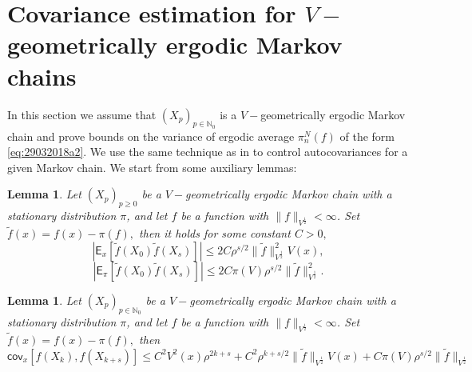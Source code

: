\documentclass[bj]{imsart}
\def\PCov{\mathsf{cov}}
\def\nset{\mathbb{N}}
\newtheorem{lem}[thm]{Lemma}
\begin{document}
\section{Covariance estimation for $V-$geometrically ergodic Markov chains}\label{sec:appendix_moments}
In this section we assume that $(X_p)_{p \in \nset_0}$ is a $V-$geometrically ergodic Markov chain and prove bounds on the variance of ergodic average $\pi_n^N(f)$ of the form \eqref{eq:29032018a2}. We use the same technique as in \cite{belomestny2019esvm} to control autocovariances for a given Markov chain. We start from some auxiliary lemmas:
\begin{lem}
\label{lem:fp_covariance}
Let $(X_p)_{p\geq 0}$ be a $V-$geometrically ergodic Markov chain with a stationary distribution $\pi$, and let $f$ be a function with $\|f\|_{V^{\frac{1}{2}}} < \infty$. Set $\tilde{f}(x) = f(x) - \pi(f),$ then it holds for some constant $C > 0,$
\begin{equation}
|\mathsf{E}_x[\tilde{f}(X_0)\tilde{f}(X_s)]| \leq 2C\rho^{s/2}\|\tilde{f}\|^2_{V^{\frac{1}{2}}}V(x),
\end{equation}
\begin{equation}
|\mathsf{E}_{\pi}[\tilde{f}(X_0)\tilde{f}(X_s)]| \leq 2C\pi(V)\rho^{s/2}\|\tilde{f}\|^2_{V^{\frac{1}{2}}}.
\end{equation}
\end{lem}
\begin{lem}
\label{lem:covariance}
Let $(X_p)_{p \in \nset_0}$ be a $V-$geometrically ergodic Markov chain with a stationary distribution $\pi$, and let $f$ be a function with $\|f\|_{V^{\frac{1}{2}}} < \infty$. Set $\tilde{f}(x) = f(x) - \pi(f),$ then
\begin{equation}
\label{eq:cov_v_ergodic}
\PCov_x \left[f(X_k),f(X_{k+s})\right] \leq C^2V^2(x)\rho^{2k+s} + C^2\rho^{k+s/2}\|\tilde{f}\|_{V^{\frac{1}{2}}}V(x) + C\pi(V)\rho^{s/2}\|\tilde{f}\|_{V^{\frac{1}{2}}}
\end{equation}
\end{lem}
\end{document}
